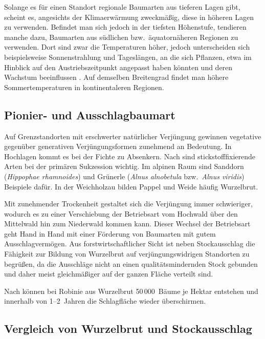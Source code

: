 \documentclass[twocolumn]{scrartcl}
\begin{document}
Solange es für einen Standort regionale Baumarten aus tieferen Lagen
gibt, scheint es, angesichts der Klimaerwärmung zweckmäßig, diese in
höheren Lagen zu verwenden. Befindet man sich jedoch in der tiefsten
Höhenstufe, tendieren manche dazu, Baumarten aus südlichen
bzw.\ äquatornäheren Regionen zu verwenden. Dort sind zwar die
Temperaturen höher, jedoch unterscheiden sich beispielsweise
Sonnenstrahlung und Tageslängen, an die sich Pflanzen, etwa im
Hinblick auf den Austriebszeitpunkt angepasst haben könnten
\citep{phillips1941tageslaenge} und deren Wachstum beeinflussen
\citep{jester1939zuwachsUndTageslaenge}. Auf demselben Breitengrad
findet man höhere Sommertemperaturen in kontinentaleren Regionen.

\subsection{Pionier- und Ausschlagbaumart}

Auf Grenzstandorten mit erschwerter natürlicher Verjüngung gewinnen
vegetative gegenüber generativen Verjüngungsformen zunehmend an
Bedeutung. In Hochlagen kommt es bei der Fichte zu Absenkern. Nach
\citet{boring1984robinie} sind stickstofffixierende Arten bei der
primären Sukzession wichtig. Im alpinen Raum sind Sanddorn
(\emph{Hippophae rhamnoides}) und Grünerle (\emph{Alnus alnobetula}
bzw.\ \emph{Alnus viridis}) Beispiele dafür. In der Weichholzau bilden
Pappel und Weide häufig Wurzelbrut.

Mit zunehmender Trockenheit gestaltet sich die Verjüngung immer
schwieriger, wodurch es zu einer Verschiebung der Betriebsart vom
Hochwald über den Mittelwald hin zum Niederwald kommen kann. Dieser
Wechsel der Betriebsart geht Hand in Hand mit einer Förderung von
Baumarten mit gutem Ausschlagvermögen. Aus forstwirtschaftlicher Sicht
ist neben Stockausschlag die Fähigkeit zur Bildung von Wurzelbrut auf
verjüngungswidrigen Standorten zu begrüßen, da die Ausschläge nicht an
einen qualitätsmindernden Stock gebunden und daher meist gleichmäßiger
auf der ganzen Fläche verteilt sind.

Nach \citet{nicolescu2019robinie} können bei Robinie aus Wurzelbrut
50\,000~Bäume je Hektar entstehen und innerhalb von 1–2~Jahren die
Schlagfläche wieder überschirmen.

\subsection{Vergleich von Wurzelbrut und Stockausschlag}
\end{document}
